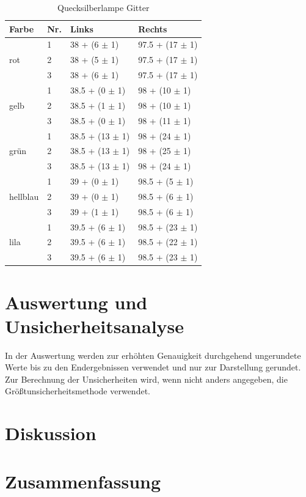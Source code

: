 \documentclass[12pt,a4paper,twoside]{article}
\begin{document}
\begin{table}[H]
    \centering
    \caption{Quecksilberlampe Gitter}
    \label{tab:Prisma v2}
    \begin{tabular}{| l | l | l | l |}
        \hline
        Farbe & Nr. & Links  & Rechts \\
        \hline
        \hline
                &  1 & 38 + (6 $\pm$ 1) & 97.5 + (17 $\pm$ 1) \\
        rot     &  2 & 38 + (5 $\pm$ 1) & 97.5 + (17 $\pm$ 1) \\
                &  3 & 38 + (6 $\pm$ 1) & 97.5 + (17 $\pm$ 1) \\
        \hline
                &  1 & 38.5 + (0 $\pm$ 1) & 98 + (10 $\pm$ 1) \\
        gelb    &  2 & 38.5 + (1 $\pm$ 1) & 98 + (10 $\pm$ 1) \\
                &  3 & 38.5 + (0 $\pm$ 1) & 98 + (11 $\pm$ 1) \\
        \hline
                &  1 & 38.5 + (13 $\pm$ 1) & 98 + (24 $\pm$ 1) \\
        grün    &  2 & 38.5 + (13 $\pm$ 1) & 98 + (25 $\pm$ 1) \\
                &  3 & 38.5 + (13 $\pm$ 1) & 98 + (24 $\pm$ 1) \\
        \hline
                &  1 & 39 + (0 $\pm$ 1) & 98.5 + (5 $\pm$ 1) \\
        hellblau&  2 & 39 + (0 $\pm$ 1) & 98.5 + (6 $\pm$ 1) \\
                &  3 & 39 + (1 $\pm$ 1) & 98.5 + (6 $\pm$ 1) \\
        \hline
                &  1 & 39.5 + (6 $\pm$ 1) & 98.5 + (23 $\pm$ 1) \\
        lila    &  2 & 39.5 + (6 $\pm$ 1) & 98.5 + (22 $\pm$ 1) \\
                &  3 & 39.5 + (6 $\pm$ 1) & 98.5 + (23 $\pm$ 1) \\
        \hline
    \end{tabular}
\end{table}

\section{Auswertung und Unsicherheitsanalyse} %

In der Auswertung werden zur erhöhten Genauigkeit durchgehend ungerundete Werte bis zu den Endergebnissen verwendet und nur zur Darstellung gerundet. \\
Zur Berechnung der Unsicherheiten wird, wenn nicht anders angegeben, die Größtunsicherheitsmethode verwendet.


\section{Diskussion} %


\section{Zusammenfassung} %


\printbibliography[heading=bibintoc]
\end{document}
